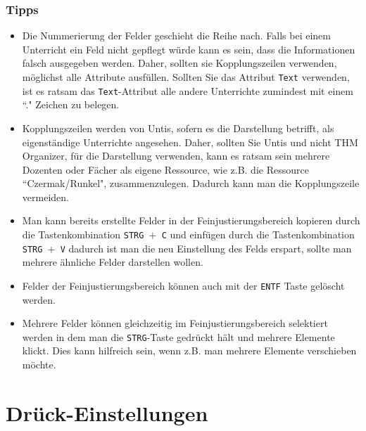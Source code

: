 \subsubsection{Tipps}

\begin{itemize}
	\item Die Nummerierung der Felder geschieht die Reihe nach. Falls bei einem Unterricht ein Feld nicht gepflegt würde kann es sein, dass die Informationen falsch ausgegeben werden. Daher, sollten sie Kopplungszeilen verwenden, möglichst alle Attribute ausfüllen. Sollten Sie das Attribut \texttt{Text} verwenden, ist es ratsam das \texttt{Text}-Attribut alle andere Unterrichte zumindest mit einem ``." \hspace{1pt} Zeichen zu belegen.
	\item Kopplungszeilen werden von Untis, sofern es die Darstellung betrifft, als eigenständige Unterrichte angesehen. Daher, sollten Sie Untis und nicht THM Organizer, für die Darstellung verwenden, kann es ratsam sein mehrere Dozenten oder Fächer als eigene Ressource, wie z.B. die Ressource ``Czermak/Runkel", zusammenzulegen. Dadurch kann man die Kopplungszeile vermeiden.
	\item Man kann bereits erstellte Felder in der Feinjustierungsbereich kopieren durch die Tastenkombination \texttt{STRG $+$ C} und einfügen durch die Tastenkombination \texttt{STRG $+$ V} dadurch ist man die neu Einstellung des Felds erspart, sollte man mehrere ähnliche Felder darstellen wollen.
	\item Felder der Feinjustierungsbereich können auch mit der \texttt{ENTF} Taste gelöscht werden.
	\item Mehrere Felder können gleichzeitig im Feinjustierungsbereich selektiert werden in dem man die \texttt{STRG}-Taste gedrückt hält und mehrere Elemente klickt. Dies kann hilfreich sein, wenn z.B. man mehrere Elemente verschieben möchte.
\end{itemize}



\section{Drück-Einstellungen}
\label{sec:druck-einstellungen}